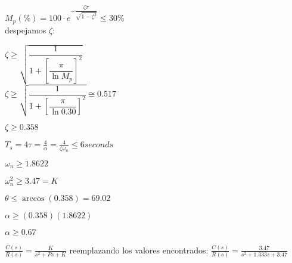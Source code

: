 \documentclass[12pt]{article}
\begin{document}
\begin{enumerate}
\begin{itemize}
    \( \displaystyle M_p(\%) = 100\cdot e^{- \dfrac{\zeta \pi}{\sqrt{1 - \zeta^{2}}}} \leq 30\% \)\\
    
    despejamos $\zeta$:

    \( \displaystyle \zeta \geq \sqrt{\dfrac{1}{1+ \left [ \dfrac{\pi}{\ln{M_{p}}} \right ]^{2} }}\)\\
    
    \(\displaystyle \zeta \geq \sqrt{\dfrac{1}{1+ \left [ \dfrac{\pi}{\ln{0.30}} \right ]^{2} }} \cong 0.517 \)

    \(\displaystyle \zeta \geq 0.358 \)

    \vspace{1cm}

    \( \displaystyle T_{s}=4\tau=\frac{4}{\alpha}=\frac{4}{\zeta \omega_{n}} \leq 6seconds \)

    $\omega_{n} \geq 1.8622$ 

    $\omega_{n}^{2} \geq 3.47=K$
      
    \vspace{0.5cm}

    $\theta \leq \arccos{(0.358)} =69.02$

    \vspace{0.5cm}

    $\alpha \geq (0.358)(1.8622)$

    $\alpha \geq 0.67$


\vspace{0.5cm}

    \(\displaystyle \frac{C(s)}{R(s)} = \frac{K}{s^2 + Ps + K} \) reemplazando
        los valores encontrados: \(\displaystyle \frac{C(s)}{R(s)}=\frac{3.47}{s^2 + 1.333s + 3.47}\)

    \end{itemize}

    \vspace{1cm}



\end{enumerate}
\end{document}
